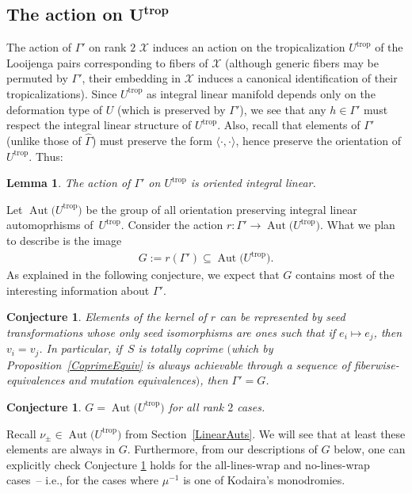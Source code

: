 \documentclass[pdftex]{sigma}
\numberwithin{equation}{section}
\numberwithin{figure}{section}
\numberwithin{table}{section}
\DeclareMathOperator{\trop}{trop}
\DeclareMathOperator{\Aut}{Aut}
\let\rar=\rightarrow
\let\s=\mathcal
\let\wh=\widehat
\newtheorem{lem}[thm]{Lemma}
\newtheorem{conj}[thm]{Conjecture}
\theoremstyle{definition}
\begin{document}
\subsection[The action on $U^{\trop}$]{The action on $\boldsymbol{U^{\trop}}$}

The action of $\Gamma'$ on rank $2$ $\s{X}$ induces an action on the tropicalization $U^{\trop}$ of the Looijenga pairs corresponding to fibers of $\s{X}$ (although generic fibers may be permuted by $\Gamma'$, their embedding in $\s{X}$ induces a canonical identification of their tropicalizations). Since $U^{\trop}$ as integral linear manifold depends only on the deformation type of $U$ (which is preserved by $\Gamma'$), we see that any $h\in \Gamma'$ must respect the integral linear structure of $U^{\trop}$. Also, recall that elements of $\Gamma'$ (unlike those of $\wh{\Gamma}$) must preserve the form $\langle \cdot,\cdot\rangle$, hence preserve the orientation of $U^{\trop}$. Thus:
\begin{lem}\label{oil}
The action of $\Gamma'$ on $U^{\trop}$ is oriented integral linear.
\end{lem}

Let $\Aut\big(U^{\trop}\big)$ be the group of all orientation preserving integral linear automoprhisms of~$U^{\trop}$. Consider the action $r\colon \Gamma' \rar \Aut\big(U^{\trop}\big)$. What we plan to describe is the image
\begin{gather*}
 G:=r(\Gamma')\subseteq \Aut\big(U^{\trop}\big).
\end{gather*}
As explained in the following conjecture, we expect that $G$ contains most of the interesting information about $\Gamma'$.
\begin{conj}Elements of the kernel of $r$ can be represented by seed transformations whose only seed isomorphisms are ones such that if $e_i\mapsto e_j$, then $v_i=v_j$. In particular, if~$S$ is totally coprime $($which by Proposition~{\rm \ref{CoprimeEquiv}} is always achievable through a sequence of fiberwise-equivalences and mutation equivalences$)$, then $\Gamma'=G$.
\end{conj}

\begin{conj}\label{AutU-Conj}$G=\Aut\big(U^{\trop}\big)$ for all rank $2$ cases.
\end{conj}
Recall $\nu_{\pm}\in\Aut\big(U^{\trop}\big)$ from Section~\ref{LinearAuts}. We will see that at least these elements are always in $G$. Furthermore, from our descriptions of $G$ below, one can explicitly check Conjecture \ref{AutU-Conj} holds for the all-lines-wrap and no-lines-wrap cases~-- i.e., for the cases where $\mu^{-1}$ is one of Kodaira's monodromies.
\end{document}
